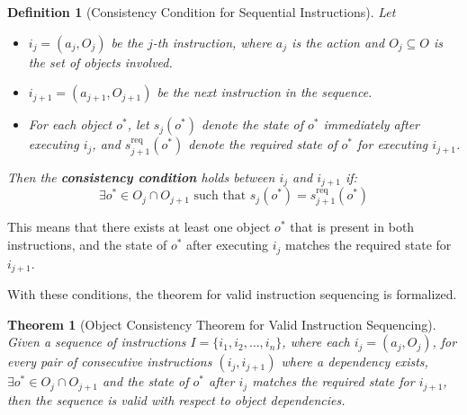 \documentclass[a4paper,11pt]{lmcs}
\newtheorem{theorem}{Theorem}
\newtheorem{definition}{Definition}
\begin{document}
\begin{definition}[Consistency Condition for Sequential Instructions]
Let
\begin{itemize}
    \item \(i_j = (a_j, O_j)\) be the \(j\)-th instruction, where \(a_j\) is the action and \(O_j \subseteq O\) is the set of objects involved.
    \item \(i_{j+1} = (a_{j+1}, O_{j+1})\) be the next instruction in the sequence.
    \item For each object \(o^*\), let \(s_j(o^*)\) denote the state of \(o^*\) immediately after executing \(i_j\), and \(s_{j+1}^{\mathrm{req}}(o^*)\) denote the required state of \(o^*\) for executing \(i_{j+1}\).
\end{itemize}
Then the \textbf{consistency condition} holds between \(i_j\) and \(i_{j+1}\) if:
\[
\exists o^* \in O_j \cap O_{j+1} \text{ such that } s_j(o^*) = s_{j+1}^{\mathrm{req}}(o^*)
\]
\end{definition}
This means that there exists at least one object \(o^*\) that is present in both instructions, and the state of \(o^*\) after executing \(i_j\) matches the required state for \(i_{j+1}\).

With these conditions, the theorem for valid instruction sequencing is formalized.

\begin{theorem}[Object Consistency Theorem for Valid Instruction Sequencing]
Given a sequence of instructions \(I = \{i_1, i_2, \ldots, i_n\}\), where each \(i_j = (a_j, O_j)\), for every pair of consecutive instructions \((i_j, i_{j+1})\) where a dependency exists, \(\exists o^* \in O_j \cap O_{j+1}\) and the state of \(o^*\) after \(i_j\) matches the required state for \(i_{j+1}\), then the sequence is valid with respect to object dependencies.
\end{theorem}
\end{document}
